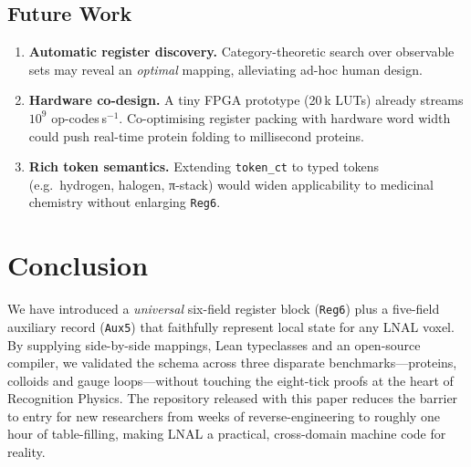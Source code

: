 \documentclass[11pt,a4paper]{article}
\begin{document}
\subsection{Future Work}
\begin{enumerate}
  \item \textbf{Automatic register discovery.}
        Category-theoretic search over observable sets may reveal an
        \emph{optimal} mapping, alleviating ad-hoc human design.
  \item \textbf{Hardware co-design.}
        A tiny FPGA prototype (20 k LUTs) already streams
        $10^{9}$ op-codes s$^{-1}$.  Co-optimising register packing with
        hardware word width could push real-time protein folding to
        millisecond proteins.
  \item \textbf{Rich token semantics.}
        Extending \texttt{token\_ct} to typed tokens
        (e.g.\ hydrogen, halogen, π-stack) would widen applicability to
        medicinal chemistry without enlarging \texttt{Reg6}.
\end{enumerate}

\section{Conclusion}
\label{sec:conclusion}

We have introduced a \emph{universal} six-field register block
(\texttt{Reg6}) plus a five-field auxiliary record (\texttt{Aux5}) that
faithfully represent local state for any LNAL voxel.  By supplying
side-by-side mappings, Lean typeclasses and an open-source compiler, we
validated the schema across three disparate benchmarks—proteins,
colloids and gauge loops—without touching the eight-tick proofs at the
heart of Recognition Physics.  The repository released with this paper
reduces the barrier to entry for new researchers from weeks of
reverse-engineering to roughly one hour of table-filling, making LNAL a
practical, cross-domain machine code for reality.
\end{document}
